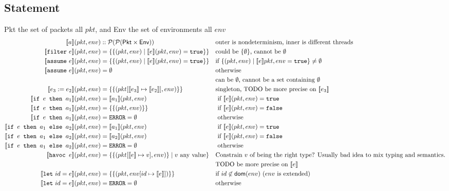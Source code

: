\documentclass{report}
\newcommand\sem[1]{\llbracket #1\rrbracket}
\newcommand{\pkt}{\ensuremath{pkt}}
\newcommand{\env}{\ensuremath{env}}
\newcommand{\true}{\texttt{true}}
\newcommand{\false}{\texttt{false}}
\newcommand{\ERROR}{\texttt{ERROR}}
\begin{document}
\subsection{Statement}
{\sf Pkt} the set of packets all \pkt, and {\sf Env} the set of environments all \env
\begin{align*}
\sem{a}(\pkt,\env) & :: \mathcal{P}(\mathcal{P}({\sf Pkt}\times{\sf Env})) &
&\text{outer is nondeterminism, inner is different threads}
\\
\sem{\texttt{filter}\ e}(\pkt,\env) & =\{\{(\pkt,\env)\mid\sem{e}(\pkt,\env)=\texttt{true}\}\} &
&\text{could be $\{\emptyset\}$, cannot be $\emptyset$}
\\
\sem{\texttt{assume}\ e}(\pkt,\env) & =\{\{(\pkt,\env)\mid\sem{e}(\pkt,\env)=\texttt{true}\}\} &
& \text{if $\{(\pkt,\env)\mid\sem{e}\pkt,\env=\texttt{true}\}\neq\emptyset$}
\\
\sem{\texttt{assume}\ e}(\pkt,\env) & =\emptyset &
& \text{otherwise}
\\& & & \text{can be $\emptyset$, cannot be a set containing $\emptyset$}
\\
\sem{e_3:=e_2}(\pkt,\env) & =\{\{(\pkt[\sem{e_3}\mapsto\sem{e_2}],\env)\}\} &
&\text{singleton, TODO be more precise on $\sem{e_3}$}
\\
\sem{\texttt{if $e$ then $a_1$}}(\pkt,\env) & = \sem{a_1}(\pkt,\env) & 
&\text{ if $\sem{e}(\pkt,\env)=\true$}
\\
\sem{\texttt{if $e$ then $a_1$}}(\pkt,\env) & = \{\{(\pkt,\env)\}\} &
&\text{ if $\sem{e}(\pkt,\env)=\false$}
\\
\sem{\texttt{if $e$ then $a_1$}}(\pkt,\env) & = \ERROR = \emptyset&
&\text{ otherwise}
\\
\sem{\texttt{if $e$ then $a_1$ else $a_2$}}(\pkt,\env) & = \sem{a_1}(\pkt,\env) &
&\text{ if $\sem{e}(\pkt,\env)=\true$}
\\
\sem{\texttt{if $e$ then $a_1$ else $a_2$}}(\pkt,\env) & = \sem{a_2}(\pkt,\env) &
&\text{ if $\sem{e}(\pkt,\env)=\false$}
\\
\sem{\texttt{if $e$ then $a_1$ else $a_2$}}(\pkt,\env) & = \ERROR=\emptyset &
&\text{ otherwise}
\\
\sem{\texttt{havoc } e}(\pkt,\env) & =\{\{(\pkt[\sem{e}\mapsto v],\env)\}\mid\text{$v$ any value}\} & &
\text{Constrain $v$ of being the right type? Usually bad idea to mix typing and semantics.}\\
&&&\text{TODO be more precise on $\sem{e}$}
\\
\sem{\texttt{let}\ id=e}(\pkt,\env) & =\{\{(\pkt,\env[id\mapsto\sem{e}])\}\} &
& \text{if $id\not\in{\sf dom}(\env)$ ($\env$ is extended)}
\\
\sem{\texttt{let}\ id=e}(\pkt,\env) & =\ERROR = \emptyset &
& \text{otherwise}
\\
\end{align*}
\end{document}

